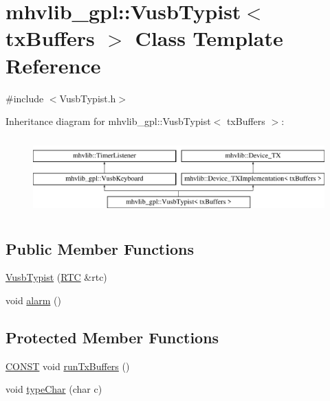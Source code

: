 \hypertarget{classmhvlib__gpl_1_1_vusb_typist}{\section{mhvlib\-\_\-gpl\-:\-:Vusb\-Typist$<$ tx\-Buffers $>$ Class Template Reference}
\label{classmhvlib__gpl_1_1_vusb_typist}
}


{\ttfamily \#include $<$Vusb\-Typist.\-h$>$}

Inheritance diagram for mhvlib\-\_\-gpl\-:\-:Vusb\-Typist$<$ tx\-Buffers $>$\-:\begin{figure}[H]
\begin{center}
\leavevmode
\includegraphics[height=2.989324cm]{classmhvlib__gpl_1_1_vusb_typist}
\end{center}
\end{figure}
\subsection*{Public Member Functions}
\begin{DoxyCompactItemize}
\item 
\hyperlink{classmhvlib__gpl_1_1_vusb_typist_a4219f6cd56ed81e01c7841b714348fab}{Vusb\-Typist} (\hyperlink{classmhvlib_1_1_r_t_c}{R\-T\-C} \&rtc)
\item 
void \hyperlink{classmhvlib__gpl_1_1_vusb_typist_aa8cbae0d5abbf10b851f816e61c611ff}{alarm} ()
\end{DoxyCompactItemize}
\subsection*{Protected Member Functions}
\begin{DoxyCompactItemize}
\item 
\hyperlink{io_8h_a0c33b494a68ce28497e7ce8e5e95feff}{C\-O\-N\-S\-T} void \hyperlink{classmhvlib__gpl_1_1_vusb_typist_ab293c01051f77e5c4278b5cc26ecaadb}{run\-Tx\-Buffers} ()
\item 
void \hyperlink{classmhvlib__gpl_1_1_vusb_typist_a64fc9a57dac30c2782666d1c7afd21a0}{type\-Char} (char c)
\end{DoxyCompactItemize}
